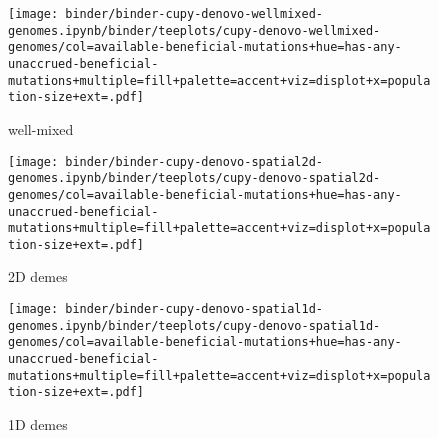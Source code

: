 \begin{sidewaysfigure}[h]
  \rotatesidewayslabel
\begin{subfigure}[b]{0.36\linewidth}
    \begin{minipage}{\linewidth}
      \texttt{[image: binder/binder-cupy-denovo-wellmixed-genomes.ipynb/binder/teeplots/cupy-denovo-wellmixed-genomes/col=available-beneficial-mutations+hue=has-any-unaccrued-beneficial-mutations+multiple=fill+palette=accent+viz=displot+x=population-size+ext=.pdf]}%
    \end{minipage}
    \begin{minipage}{\linewidth}
    \caption{well-mixed}
    \label{fig:unaccrued-denovo-cupy:wellmixed}
    \end{minipage}%
\end{subfigure}%
\begin{subfigure}[b]{0.32\linewidth}
    \begin{minipage}{\linewidth}
      \texttt{[image: binder/binder-cupy-denovo-spatial2d-genomes.ipynb/binder/teeplots/cupy-denovo-spatial2d-genomes/col=available-beneficial-mutations+hue=has-any-unaccrued-beneficial-mutations+multiple=fill+palette=accent+viz=displot+x=population-size+ext=.pdf]}%
    \end{minipage}
    \begin{minipage}{\linewidth}
    \caption{2D demes}
    \label{fig:unaccrued-denovo-cupy:spatial2d}
    \end{minipage}%
\end{subfigure}%
\begin{subfigure}[b]{0.32\linewidth}
    \begin{minipage}{\linewidth}
      \texttt{[image: binder/binder-cupy-denovo-spatial1d-genomes.ipynb/binder/teeplots/cupy-denovo-spatial1d-genomes/col=available-beneficial-mutations+hue=has-any-unaccrued-beneficial-mutations+multiple=fill+palette=accent+viz=displot+x=population-size+ext=.pdf]}%
    \end{minipage}
    \begin{minipage}{\linewidth}
    \caption{1D demes}
    \label{fig:unaccrued-denovo-cupy:spatial1d}
    \end{minipage}%
\end{subfigure}%


\end{sidewaysfigure}
